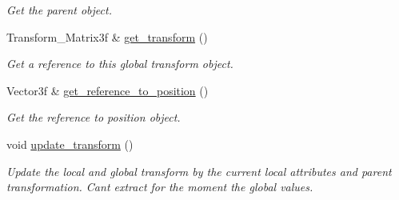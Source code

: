 \begin{DoxyCompactItemize}
\begin{DoxyCompactList}\small\item\em Get the parent object. \end{DoxyCompactList}\item 
Transform\+\_\+\+Matrix3f \& \mbox{\hyperlink{classprzurro_1_1_scene___object_ab0e3eea8f57f4f8dac0597cebfbf3592}{get\+\_\+transform}} ()
\begin{DoxyCompactList}\small\item\em Get a reference to this global transform object. \end{DoxyCompactList}\item 
Vector3f \& \mbox{\hyperlink{classprzurro_1_1_scene___object_abeb836faf2b3cb2a93f082a10e3f684b}{get\+\_\+reference\+\_\+to\+\_\+position}} ()
\begin{DoxyCompactList}\small\item\em Get the reference to position object. \end{DoxyCompactList}\item 
void \mbox{\hyperlink{classprzurro_1_1_scene___object_aa995f210f23d6e36477c6745cd3bb097}{update\+\_\+transform}} ()
\begin{DoxyCompactList}\small\item\em Update the local and global transform by the current local attributes and parent transformation. Can\textquotesingle{}t extract for the moment the global values. \end{DoxyCompactList}\end{DoxyCompactItemize}
